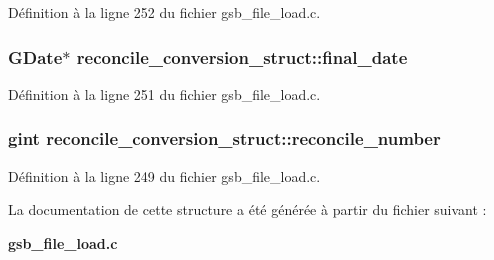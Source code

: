 Définition à la ligne 252 du fichier gsb\_\-file\_\-load.c.

\subsubsection[{final\_\-date}]{\setlength{\rightskip}{0pt plus 5cm}GDate$\ast$ {\bf reconcile\_\-conversion\_\-struct::final\_\-date}}\label{structreconcile__conversion__struct_adbfa9d8767376f25f0b97e491186d065}


Définition à la ligne 251 du fichier gsb\_\-file\_\-load.c.

\subsubsection[{reconcile\_\-number}]{\setlength{\rightskip}{0pt plus 5cm}gint {\bf reconcile\_\-conversion\_\-struct::reconcile\_\-number}}\label{structreconcile__conversion__struct_a2b12576ce3d472c0af5e3af4c50776c6}


Définition à la ligne 249 du fichier gsb\_\-file\_\-load.c.



La documentation de cette structure a été générée à partir du fichier suivant :\begin{DoxyCompactItemize}
\item 
{\bf gsb\_\-file\_\-load.c}\end{DoxyCompactItemize}

